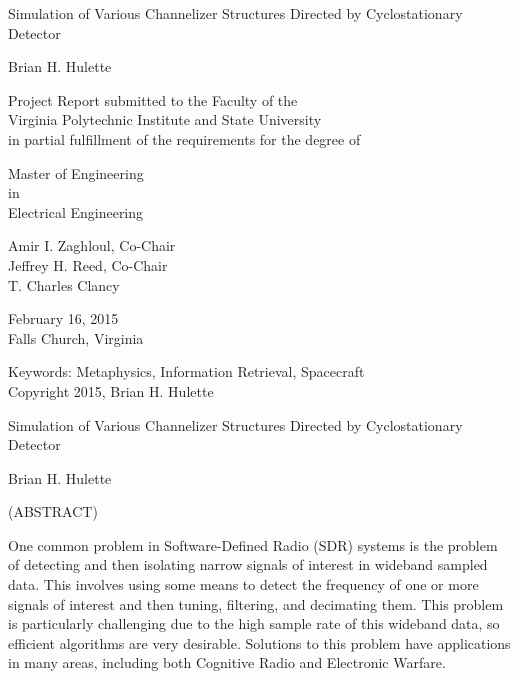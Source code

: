 \documentclass[12pt,dvips]{report}
\begin{document}
\thispagestyle{empty}
\begin{center}

{\large
Simulation of Various Channelizer Structures 
Directed by Cyclostationary Detector}

\vfill

Brian H. Hulette

\vfill

Project Report submitted to the Faculty of the \\
Virginia Polytechnic Institute and State University \\
in partial fulfillment of the requirements for the degree of

\vfill

Master of Engineering \\
in \\
Electrical Engineering

\vfill

Amir I. Zaghloul, Co-Chair \\
Jeffrey H. Reed, Co-Chair \\
T. Charles Clancy

\vfill

February 16, 2015 \\
Falls Church, Virginia

\vfill

Keywords: Metaphysics, Information Retrieval, Spacecraft
\\
Copyright 2015, Brian H. Hulette

\end{center}

\pagebreak

\thispagestyle{empty}
\begin{center}

{\large Simulation of Various Channelizer Structures 
Directed by Cyclostationary Detector}

\vfill

Brian H. Hulette

\vfill

(ABSTRACT)

\vfill

\end{center}

One common problem in Software-Defined Radio (SDR) systems is the problem of detecting and then isolating narrow signals of interest in wideband sampled data. This involves using some means to detect the frequency of one or more signals of interest and then tuning, filtering, and decimating them. This problem is particularly challenging due to the high sample rate of this wideband data, so efficient algorithms are very desirable. Solutions to this problem have applications in many areas, including both Cognitive Radio and Electronic Warfare.
\end{document}
